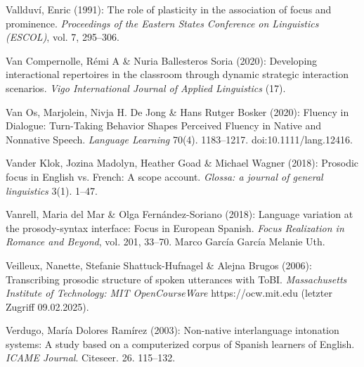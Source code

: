 \begin{styleBibliography}
Vallduví, Enric (1991): The role of plasticity in the association of focus and prominence. \textit{Proceedings of the Eastern States Conference on Linguistics (ESCOL)}, vol. 7, 295–306.
\end{styleBibliography}

\begin{styleBibliography}
Van Compernolle, Rémi A \& Nuria Ballesteros Soria (2020): Developing interactional repertoires in the classroom through dynamic strategic interaction scenarios. \textit{Vigo International Journal of Applied Linguistics} (17).
\end{styleBibliography}

\begin{styleBibliography}
Van Os, Marjolein, Nivja H. De Jong \& Hans Rutger Bosker (2020): Fluency in Dialogue: Turn-Taking Behavior Shapes Perceived Fluency in Native and Nonnative Speech. \textit{Language Learning} 70(4). 1183–1217. doi:10.1111/lang.12416.
\end{styleBibliography}

\begin{styleBibliography}
Vander Klok, Jozina Madolyn, Heather Goad \& Michael Wagner (2018): Prosodic focus in English vs. French: A scope account. \textit{Glossa: a journal of general linguistics} 3(1). 1–47.
\end{styleBibliography}

\begin{styleBibliography}
Vanrell, Maria del Mar \& Olga Fernández-Soriano (2018): Language variation at the prosody-syntax interface: Focus in European Spanish. \textit{Focus Realization in Romance and Beyond}, vol. 201, 33–70. Marco García García Melanie Uth.
\end{styleBibliography}

\begin{styleBibliography}
Veilleux, Nanette, Stefanie Shattuck-Hufnagel \& Alejna Brugos (2006): Transcribing prosodic structure of spoken utterances with ToBI. \textit{Massachusetts Institute of Technology: MIT OpenCourseWare} https://ocw.mit.edu (letzter Zugriff 09.02.2025).
\end{styleBibliography}

\begin{styleBibliography}
Verdugo, María Dolores Ramírez (2003): Non-native interlanguage intonation systems: A study based on a computerized corpus of Spanish learners of English. \textit{ICAME Journal}. Citeseer. 26. 115–132.
\end{styleBibliography}

